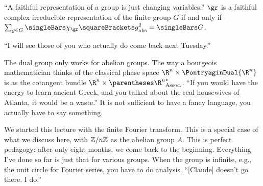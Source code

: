 \documentclass[10pt, a4paper, twoside]{lecturenotes}
\newcommand{\Rn}{{\R^n}}
\begin{document}
``A faithful representation of a group is just changing variables.''
$\gr$ is a faithful complex irreducible representation of the finite group $G$ if and only if $\sum{g\in G} \abs{\Character[\gr]\of g}^2 = \Cardinality G$.

``I will see those of you who actually do come back next Tuesday.''

\NewLecture[date=2013-03-19, official=true]
The dual group only works for abelian groups. 
The way a bourgeois mathematician thinks of the classical phase space $\Rn\Cartesian\PontryaginDual\Rn$ is as the cotangent bundle $\Rn\Cartesian\Dual{\pa\Rn}$.
``If you would have the energy to learn ancient Greek, and you talked about the real housewives of Atlanta, it would be a waste.'' It is not sufficient to have a fancy language, you actually have to say something.

We started this lecture with the finite Fourier transform. This is a special case of what we discuss here, with $\mathbb{Z} /{n}\mathbb{Z}$ as the abelian group $A$. This is perfect pedagogy: after only eight months, we come back to the beginning. Everything I've done so far is just that for various groups. When the group is infinite, e.g., the unit circle for Fourier series, you have to do analysis. ``[Claude] doesn't go there. I do.''
\end{document}
